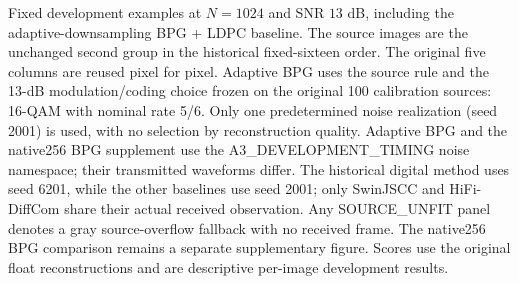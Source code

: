 \caption{Fixed development examples at $N=1024$ and SNR $13$ dB, including the adaptive-downsampling BPG + LDPC baseline. The source images are the unchanged second group in the historical fixed-sixteen order. The original five columns are reused pixel for pixel. Adaptive BPG uses the source rule and the 13-dB modulation/coding choice frozen on the original 100 calibration sources: 16-QAM with nominal rate 5/6. Only one predetermined noise realization (seed 2001) is used, with no selection by reconstruction quality. Adaptive BPG and the native256 BPG supplement use the A3\_DEVELOPMENT\_TIMING noise namespace; their transmitted waveforms differ. The historical digital method uses seed 6201, while the other baselines use seed 2001; only SwinJSCC and HiFi-DiffCom share their actual received observation. Any SOURCE\_UNFIT panel denotes a gray source-overflow fallback with no received frame. The native256 BPG comparison remains a separate supplementary figure. Scores use the original float reconstructions and are descriptive per-image development results.}
